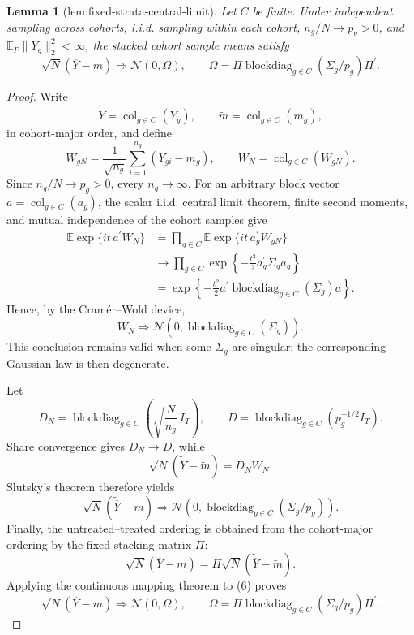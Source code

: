 \documentclass{article}
\newtheorem{lemma}{Lemma}
\begin{document}
\begin{lemma}[lem:fixed-strata-central-limit]\label{lem:fixed-strata-central-limit}
Let \(C\) be finite. Under independent sampling across cohorts, i.i.d. sampling within each cohort, \(n_g/N\to p_g>0\), and \(\mathbb E_P\|Y_g\|_2^2<\infty\), the stacked cohort sample means satisfy
\[
\sqrt N(\overline Y-m)\Rightarrow\mathcal N(0,\Omega),
\qquad
\Omega=\Pi\operatorname{blockdiag}_{g\in C}(\Sigma_g/p_g)\Pi^{\prime}.
\]
\end{lemma}
\begin{proof}
Write
\[
\widetilde{\overline Y}
=\operatorname{col}_{g\in C}(\overline Y_g),
\qquad
\widetilde m=\operatorname{col}_{g\in C}(m_g),
\]
in cohort-major order, and define
\[
W_{gN}
=\frac1{\sqrt{n_g}}\sum_{i=1}^{n_g}(Y_{gi}-m_g),
\qquad
W_N=\operatorname{col}_{g\in C}(W_{gN}).
\tag{1}
\]
Since \(n_g/N\to p_g>0\), every \(n_g\to\infty\). For an arbitrary
block vector \(a=\operatorname{col}_{g\in C}(a_g)\), the scalar
i.i.d. central limit theorem, finite second moments, and mutual
independence of the cohort samples give
\[
\begin{aligned}
\mathbb E\exp\{it\,a^\prime W_N\}
&=\prod_{g\in C}
\mathbb E\exp\{it\,a_g^\prime W_{gN}\}\\
&\longrightarrow
\prod_{g\in C}
\exp\!\left\{-\frac{t^2}{2}a_g^\prime\Sigma_ga_g\right\}\\
&=\exp\!\left\{-\frac{t^2}{2}
a^\prime\operatorname{blockdiag}_{g\in C}(\Sigma_g)a\right\}.
\end{aligned}
\tag{2}
\]
Hence, by the Cram\'er--Wold device,
\[
W_N\Rightarrow
\mathcal N\!\left(
0,\operatorname{blockdiag}_{g\in C}(\Sigma_g)
\right).
\tag{3}
\]
This conclusion remains valid when some \(\Sigma_g\) are singular;
the corresponding Gaussian law is then degenerate.

Let
\[
D_N=\operatorname{blockdiag}_{g\in C}
\left(\sqrt{\frac N{n_g}}\,I_T\right),
\qquad
D=\operatorname{blockdiag}_{g\in C}
\left(p_g^{-1/2}I_T\right).
\tag{4}
\]
Share convergence gives \(D_N\to D\), while
\[
\sqrt N(\widetilde{\overline Y}-\widetilde m)=D_NW_N.
\tag{5}
\]
Slutsky's theorem therefore yields
\[
\sqrt N(\widetilde{\overline Y}-\widetilde m)
\Rightarrow
\mathcal N\!\left(
0,\operatorname{blockdiag}_{g\in C}(\Sigma_g/p_g)
\right).
\tag{6}
\]
Finally, the untreated--treated ordering is obtained from the
cohort-major ordering by the fixed stacking matrix \(\Pi\):
\[
\sqrt N(\overline Y-m)
=\Pi\sqrt N(\widetilde{\overline Y}-\widetilde m).
\tag{7}
\]
Applying the continuous mapping theorem to (6) proves
\[
\sqrt N(\overline Y-m)
\Rightarrow
\mathcal N(0,\Omega),
\qquad
\Omega
=\Pi\operatorname{blockdiag}_{g\in C}
(\Sigma_g/p_g)\Pi^\prime.
\]
\end{proof}
\end{document}
